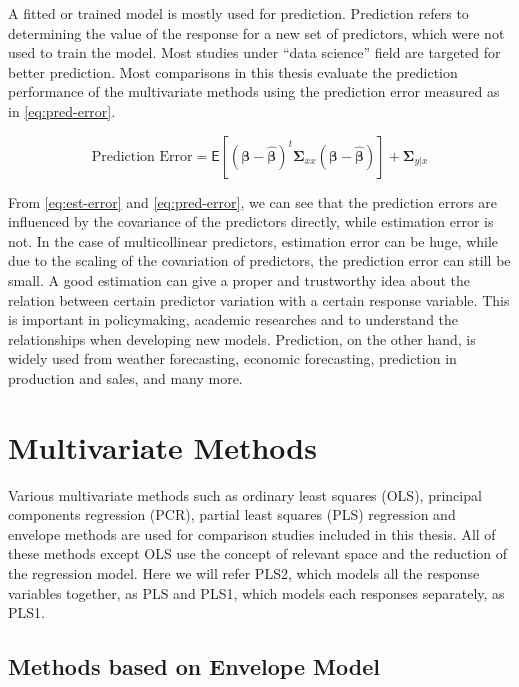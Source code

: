 \documentclass[11pt,twoside,openright,titlepage,
  headinclude,footinclude,BCOR=5mm,
  numbers=noenddot,cleardoublepage=empty,
  tablecaptionabove, dottedtoc,
  bibliography=totoc,paper=a4]{scrreprt}
\begin{document}
A fitted or trained model is mostly used for prediction. Prediction refers to determining the value of the response for a new set of predictors, which were not used to train the model. Most studies under ``data science'' field are targeted for better prediction. Most comparisons in this thesis evaluate the prediction performance of the multivariate methods using the prediction error measured as in \eqref{eq:pred-error}.

\begin{equation}
\text{Prediction Error} = \mathsf{E}\left[
  \left(\boldsymbol{\beta} - \hat{\boldsymbol{\beta}}\right)^t
  \boldsymbol{\Sigma}_{xx}
  \left(\boldsymbol{\beta} - \hat{\boldsymbol{\beta}}\right)
\right] + \boldsymbol{\Sigma}_{y|x}
\label{eq:pred-error}
\end{equation}

From \eqref{eq:est-error} and \eqref{eq:pred-error}, we can see that the prediction errors are influenced by the covariance of the predictors directly, while estimation error is not. In the case of multicollinear predictors, estimation error can be huge, while due to the scaling of the covariation of predictors, the prediction error can still be small. A good estimation can give a proper and trustworthy idea about the relation between certain predictor variation with a certain response variable. This is important in policymaking, academic researches and to understand the relationships when developing new models. Prediction, on the other hand, is widely used from weather forecasting, economic forecasting, prediction in production and sales, and many more.

\hypertarget{multivariate-methods}{%
\section{Multivariate Methods}\label{multivariate-methods}}

Various multivariate methods such as ordinary least squares (OLS), principal components regression (PCR), partial least squares (PLS) regression and envelope methods are used for comparison studies included in this thesis. All of these methods except OLS use the concept of relevant space and the reduction of the regression model. Here we will refer PLS2, which models all the response variables together, as PLS and PLS1, which models each responses separately, as PLS1.

\hypertarget{methods-based-on-envelope-model}{%
\subsection{Methods based on Envelope Model}\label{methods-based-on-envelope-model}}
\end{document}
